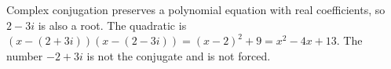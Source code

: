 Complex conjugation preserves a polynomial equation with real coefficients, so $\boxed{2-3i}$ is also a root. The quadratic is $(x-(2+3i))(x-(2-3i))=(x-2)^2+9=\boxed{x^2-4x+13}$. The number $-2+3i$ is not the conjugate and is not forced.
